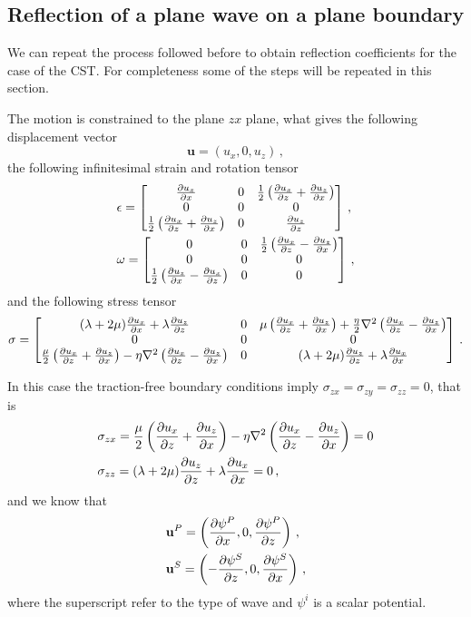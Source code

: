 \documentclass[12pt]{article}
\begin{document}
\subsection{Reflection of a plane wave on a plane boundary}

We can repeat the process followed before to obtain reflection coefficients for the case of the CST. For completeness some of the steps will be repeated in this section.

The motion is constrained to the plane \(zx\) plane, what gives the following displacement vector
\[\mathbf{u} = (u_x, 0, u_z)\, ,\]
the following infinitesimal strain and rotation tensor
\begin{align*}
  &\epsilon = \begin{bmatrix}
    \pdv{u_x}{x} &0 &\frac{1}{2}\left(\pdv{u_x}{z} + \pdv{u_z}{x}\right)\\
    0 &0 &0\\
    \frac{1}{2}\left(\pdv{u_x}{z} + \pdv{u_z}{x}\right) &0 &\pdv{u_z}{z}
    \end{bmatrix}\, ,\\
  &\omega = \begin{bmatrix}
    0 &0 &\frac{1}{2}\left(\pdv{u_x}{z} - \pdv{u_z}{x}\right)\\
    0 &0 &0\\
    \frac{1}{2}\left(\pdv{u_z}{x} - \pdv{u_x}{z}\right) &0 &0
    \end{bmatrix}\, ,
\end{align*}
and the following stress tensor
\[\sigma = \begin{bmatrix}
  (\lambda + 2\mu)\pdv{u_x}{x} + \lambda \pdv{u_z}{z} &0 &\mu\left(\pdv{u_x}{z} + \pdv{u_z}{x}\right) + \frac{\eta}{2}\laplacian \left(\pdv{u_x}{z} - \pdv{u_z}{x}\right)\\
  0 &0 &0\\
  \frac{\mu}{2}\left(\pdv{u_x}{z} + \pdv{u_z}{x}\right) - \eta\laplacian\left(\pdv{u_x}{z} - \pdv{u_z}{x}\right) &0 &(\lambda + 2\mu)\pdv{u_z}{z} + \lambda\pdv{u_x}{x}
\end{bmatrix}\, .\]

In this case the traction-free boundary conditions imply \(\sigma_{zx} = \sigma_{zy}=\sigma_{zz} = 0\), that is
\begin{align*}
  &\sigma_{zx} = \frac{\mu}{2}\left(\pdv{u_x}{z} + \pdv{u_z}{x}\right) - \eta\laplacian\left(\pdv{u_x}{z} - \pdv{u_z}{x}\right) = 0\\
  &\sigma_{zz} = (\lambda + 2\mu)\pdv{u_z}{z} + \lambda \pdv{u_x}{x} = 0\, ,
\end{align*}
and we know that
\begin{align*}
  &\mathbf{u}^P = \left(\pdv{\psi^P}{x}, 0, \pdv{\psi^P}{z}\right)\, ,\\
  &\mathbf{u}^S = \left(-\pdv{\psi^S}{z}, 0, \pdv{\psi^S}{x}\right)\, ,
\end{align*}
where the superscript refer to the type of wave and \(\psi^i\) is a scalar potential.
\end{document}
